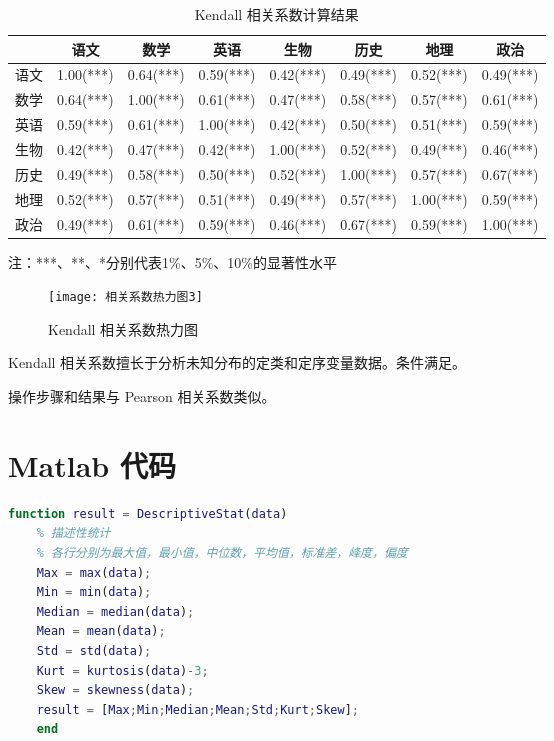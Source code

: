 \documentclass[withoutpreface]{cumcmthesis}
\begin{document}
\begin{table}[H]
    \centering
    \caption{Kendall 相关系数计算结果}\label{Tab:7}
    \begin{tabular}{|c|c|c|c|c|c|c|c|}
        \hline
           & 语文        & 数学        & 英语        & 生物        & 历史        & 地理        & 政治                  \\
        \hline
        语文 & 1.00(***) & 0.64(***) & 0.59(***) & 0.42(***) & 0.49(***) & 0.52(***) & 0.49(***) \bigstrut \\
        \hline
        数学 & 0.64(***) & 1.00(***) & 0.61(***) & 0.47(***) & 0.58(***) & 0.57(***) & 0.61(***) \bigstrut \\
        \hline
        英语 & 0.59(***) & 0.61(***) & 1.00(***) & 0.42(***) & 0.50(***) & 0.51(***) & 0.59(***) \bigstrut \\
        \hline
        生物 & 0.42(***) & 0.47(***) & 0.42(***) & 1.00(***) & 0.52(***) & 0.49(***) & 0.46(***) \bigstrut \\
        \hline
        历史 & 0.49(***) & 0.58(***) & 0.50(***) & 0.52(***) & 1.00(***) & 0.57(***) & 0.67(***) \bigstrut \\
        \hline
        地理 & 0.52(***) & 0.57(***) & 0.51(***) & 0.49(***) & 0.57(***) & 1.00(***) & 0.59(***) \bigstrut \\
        \hline
        政治 & 0.49(***) & 0.61(***) & 0.59(***) & 0.46(***) & 0.67(***) & 0.59(***) & 1.00(***) \bigstrut \\
        \hline
    \end{tabular}

    \vspace{0.3cm}
    {注：***、**、*分别代表1\%、5\%、10\%的显著性水平}
\end{table}

\begin{figure}[H]
    \centering
    \texttt{[image: 相关系数热力图3]}
    \caption{Kendall 相关系数热力图}
\end{figure}

Kendall 相关系数擅长于分析未知分布的定类和定序变量数据。条件满足。

操作步骤和结果与 Pearson 相关系数类似。

\appendix 

\section{Matlab 代码}
    \begin{lstlisting}[language=matlab ,caption={描述性统计} ]
    function result = DescriptiveStat(data)
    % 描述性统计
    % 各行分别为最大值，最小值，中位数，平均值，标准差，峰度，偏度
    Max = max(data);
    Min = min(data);
    Median = median(data);
    Mean = mean(data);
    Std = std(data);
    Kurt = kurtosis(data)-3;
    Skew = skewness(data);
    result = [Max;Min;Median;Mean;Std;Kurt;Skew];
    end
    \end{lstlisting}
\end{document}
